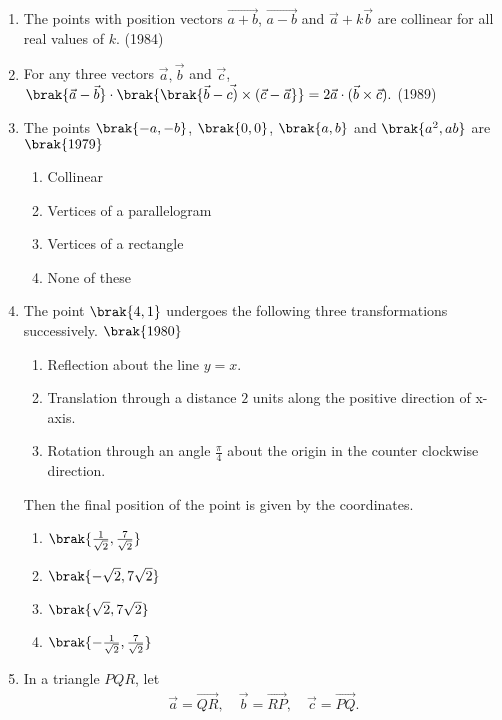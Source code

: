 \begin{enumerate}[label=\thesubsection.\arabic*.,ref=\thesubsection.\theenumi]
\item The points with position vectors $\vec{a+b}$, $\vec{a-b}$ and $\vec{a}+k\vec{b}$ are collinear for all real values of $k$.
\hfill (1984)
\item For any three vectors $\vec{a}, \vec{b}$ and $\vec{c}$, $\brak{\vec{a}-\vec{b}}\cdot\brak{{\brak{\vec{b}-\vec{c)}\times(\vec{c}-\vec{a}}}} = 2\vec{a}\cdot(\vec{b}\times\vec{c}).$
\hfill (1989)
\item The points $\brak{-a,-b}$, $\brak{0,0}$, $\brak{a,b}$ and $\brak{a^2,ab}$ are \hfill{$\brak{1979}$}
\begin{enumerate}
      \item Collinear
    \item  Vertices of a parallelogram
    \item Vertices of a rectangle
    \item None of these
\end{enumerate}
\item  The point $\brak{4,1}$ undergoes the following three transformations successively.
\hfill{$\brak{1980}$}
\begin{enumerate}
    \item Reflection about the line $y=x$.
    \item Translation through a distance $2$ units along the positive direction of x-axis.
    \item Rotation through an angle $\frac{\pi}{4}$ about the origin in the counter clockwise direction.
\end{enumerate}
Then the final position of the point is given by the coordinates.
    \begin{multicols}{4} 
\begin{enumerate} 
    \item $\brak{\frac{1}{\sqrt{2}},\frac{7}{\sqrt{2}}}$
    \item $\brak{-\sqrt{2},7\sqrt{2}}$
    \item $\brak{\sqrt{2},7\sqrt{2}}$
    \item $\brak{-\frac{1}{\sqrt{2}},\frac{7}{\sqrt{2}}}$
\end{enumerate}
    \end{multicols}
\item   In a triangle $PQR$, let 
\begin{align}
   \vec{a} = \overrightarrow{QR}, \quad \vec{b} = \overrightarrow{RP}, \quad \vec{c} = \overrightarrow{PQ}.
\end{align}


\end{enumerate}
